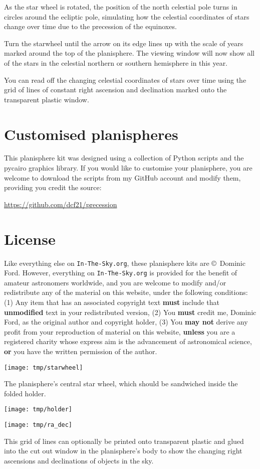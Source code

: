 \documentclass[a4paper,onecolumn,10pt]{article}
\begin{document}
As the star wheel is rotated, the position of the north celestial pole turns in
circles around the ecliptic pole, simulating how the celestial coordinates of
stars change over time due to the precession of the equinoxes.

Turn the starwheel until the arrow on its edge lines up with the scale of years
marked around the top of the planisphere. The viewing window will now show all
of the stars in the celestial northern or southern hemisphere in this year.

You can read off the changing celestial coordinates of stars over time using
the grid of lines of constant right ascension and declination marked onto the
transparent plastic window.

\section*{Customised planispheres}

This planisphere kit was designed using a collection of Python scripts and the
pycairo graphics library. If you would like to customise your planisphere, you
are welcome to download the scripts from my GitHub account and modify them,
providing you credit the source:

\url{https://github.com/dcf21/precession}

\section*{License}

Like everything else on {\tt In-The-Sky.org}, these planisphere kits are
\copyright\ Dominic Ford. However, everything on {\tt In-The-Sky.org} is
provided for the benefit of amateur astronomers worldwide, and you are welcome
to modify and/or redistribute any of the material on this website, under the
following conditions: (1) Any item that has an associated copyright text {\bf
must} include that {\bf unmodified} text in your redistributed version, (2) You
{\bf must} credit me, Dominic Ford, as the original author and copyright
holder, (3) You {\bf may not} derive any profit from your reproduction of
material on this website, {\bf unless} you are a registered charity whose
express aim is the advancement of astronomical science, {\bf or} you have the
written permission of the author.

\newpage

\centerline{\texttt{[image: tmp/starwheel]}}

\vspace{1cm}
The planisphere's central star wheel, which should be sandwiched inside the folded holder.

\newpage
\thispagestyle{empty}
\vspace*{-3.0cm}
\centerline{\texttt{[image: tmp/holder]}}
\newpage

\centerline{\texttt{[image: tmp/ra\_dec]}}

\vspace{1cm}
This grid of lines can optionally be printed onto transparent plastic and glued into the cut out window in the planisphere's body to show the changing right ascensions and declinations of objects in the sky.
\end{document}
